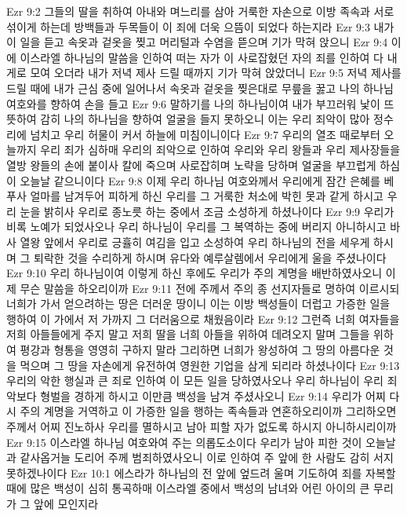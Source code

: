 Ezr 9:2  그들의 딸을 취하여 아내와 며느리를 삼아 거룩한 자손으로 이방 족속과 서로 섞이게 하는데 방백들과 두목들이 이 죄에 더욱 으뜸이 되었다 하는지라
Ezr 9:3  내가 이 일을 듣고 속옷과 겉옷을 찢고 머리털과 수염을 뜯으며 기가 막혀 앉으니
Ezr 9:4  이에 이스라엘 하나님의 말씀을 인하여 떠는 자가 이 사로잡혔던 자의 죄를 인하여 다 내게로 모여 오더라 내가 저녁 제사 드릴 때까지 기가 막혀 앉았더니
Ezr 9:5  저녁 제사를 드릴 때에 내가 근심 중에 일어나서 속옷과 겉옷을 찢은대로 무릎을 꿇고 나의 하나님 여호와를 향하여 손을 들고
Ezr 9:6  말하기를 나의 하나님이여 내가 부끄러워 낯이 뜨뜻하여 감히 나의 하나님을 향하여 얼굴을 들지 못하오니 이는 우리 죄악이 많아 정수리에 넘치고 우리 허물이 커서 하늘에 미침이니이다
Ezr 9:7  우리의 열조 때로부터 오늘까지 우리 죄가 심하매 우리의 죄악으로 인하여 우리와 우리 왕들과 우리 제사장들을 열방 왕들의 손에 붙이사 칼에 죽으며 사로잡히며 노략을 당하며 얼굴을 부끄럽게 하심이 오늘날 같으니이다
Ezr 9:8  이제 우리 하나님 여호와께서 우리에게 잠간 은혜를 베푸사 얼마를 남겨두어 피하게 하신 우리를 그 거룩한 처소에 박힌 못과 같게 하시고 우리 눈을 밝히사 우리로 종노릇 하는 중에서 조금 소성하게 하셨나이다
Ezr 9:9  우리가 비록 노예가 되었사오나 우리 하나님이 우리를 그 복역하는 중에 버리지 아니하시고 바사 열왕 앞에서 우리로 긍휼히 여김을 입고 소성하여 우리 하나님의 전을 세우게 하시며 그 퇴락한 것을 수리하게 하시며 유다와 예루살렘에서 우리에게 울을 주셨나이다
Ezr 9:10  우리 하나님이여 이렇게 하신 후에도 우리가 주의 계명을 배반하였사오니 이제 무슨 말씀을 하오리이까
Ezr 9:11  전에 주께서 주의 종 선지자들로 명하여 이르시되 너희가 가서 얻으려하는 땅은 더러운 땅이니 이는 이방 백성들이 더럽고 가증한 일을 행하여 이 가에서 저 가까지 그 더러움으로 채웠음이라
Ezr 9:12  그런즉 너희 여자들을 저희 아들들에게 주지 말고 저희 딸을 너희 아들을 위하여 데려오지 말며 그들을 위하여 평강과 형통을 영영히 구하지 말라 그리하면 너희가 왕성하여 그 땅의 아름다운 것을 먹으며 그 땅을 자손에게 유전하여 영원한 기업을 삼게 되리라 하셨나이다
Ezr 9:13  우리의 악한 행실과 큰 죄로 인하여 이 모든 일을 당하였사오나 우리 하나님이 우리 죄악보다 형벌을 경하게 하시고 이만큼 백성을 남겨 주셨사오니
Ezr 9:14  우리가 어찌 다시 주의 계명을 거역하고 이 가증한 일을 행하는 족속들과 연혼하오리이까 그리하오면 주께서 어찌 진노하사 우리를 멸하시고 남아 피할 자가 없도록 하시지 아니하시리이까
Ezr 9:15  이스라엘 하나님 여호와여 주는 의롭도소이다 우리가 남아 피한 것이 오늘날과 같사옵거늘 도리어 주께 범죄하였사오니 이로 인하여 주 앞에 한 사람도 감히 서지 못하겠나이다
Ezr 10:1  에스라가 하나님의 전 앞에 엎드려 울며 기도하여 죄를 자복할 때에 많은 백성이 심히 통곡하매 이스라엘 중에서 백성의 남녀와 어린 아이의 큰 무리가 그 앞에 모인지라
